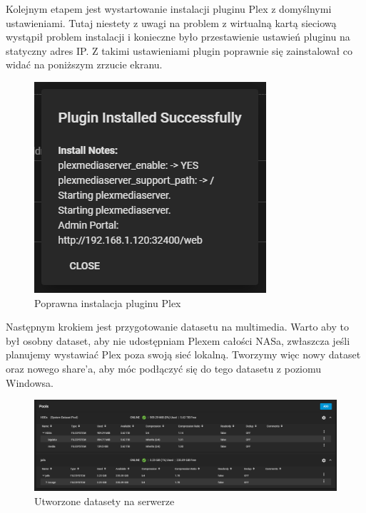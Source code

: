\documentclass[12pt,a4paper]{article}
\newcommand{\<}{\langle}
\renewcommand{\>}{\rangle}
\theoremstyle{definition}
\begin{document}
Kolejnym etapem jest wystartowanie instalacji pluginu Plex z domyślnymi ustawieniami. Tutaj niestety z uwagi na problem z wirtualną kartą sieciową wystąpił problem instalacji i konieczne było przestawienie ustawień pluginu na statyczny adres IP. Z takimi ustawieniami plugin poprawnie się zainstalował co widać na poniższym zrzucie ekranu.

\begin{figure}[H]
    \centering
    \includegraphics{img/ss_plex/7.png}
    \caption{Poprawna instalacja pluginu Plex}
\end{figure}

Następnym krokiem jest przygotowanie datasetu na multimedia. Warto aby to był osobny dataset, aby nie udostępniam Plexem całości NASa, zwłaszcza jeśli planujemy wystawiać Plex poza swoją sieć lokalną. Tworzymy więc nowy dataset oraz nowego share'a, aby móc podłączyć się do tego datasetu z poziomu Windowsa.

\begin{figure}[H]
    \centering
    \includegraphics[width=\linewidth]{img/ss_plex/11.png}
    \caption{Utworzone datasety na serwerze}
\end{figure}
\end{document}
